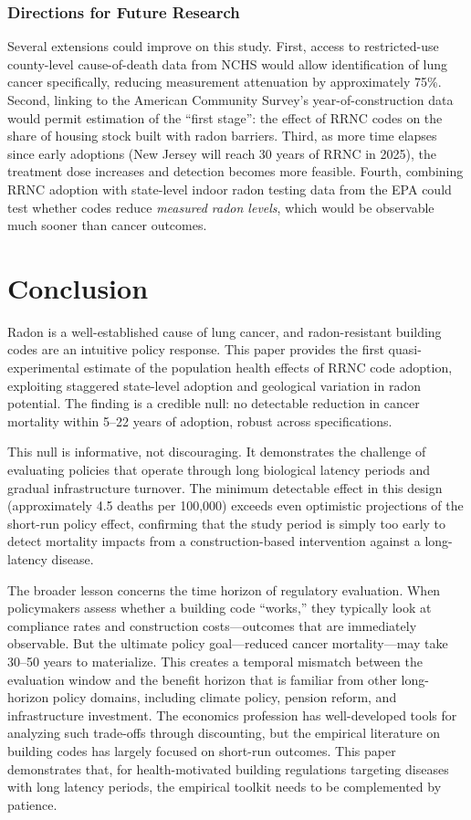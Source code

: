 \documentclass[12pt]{article}
\begin{document}
\subsubsection*{Directions for Future Research} Several extensions could improve on this study. First, access to restricted-use county-level cause-of-death data from NCHS would allow identification of lung cancer specifically, reducing measurement attenuation by approximately 75\%. Second, linking to the American Community Survey's year-of-construction data would permit estimation of the ``first stage'': the effect of RRNC codes on the share of housing stock built with radon barriers. Third, as more time elapses since early adoptions (New Jersey will reach 30 years of RRNC in 2025), the treatment dose increases and detection becomes more feasible. Fourth, combining RRNC adoption with state-level indoor radon testing data from the EPA could test whether codes reduce \emph{measured radon levels}, which would be observable much sooner than cancer outcomes.


\section{Conclusion}

Radon is a well-established cause of lung cancer, and radon-resistant building codes are an intuitive policy response. This paper provides the first quasi-experimental estimate of the population health effects of RRNC code adoption, exploiting staggered state-level adoption and geological variation in radon potential. The finding is a credible null: no detectable reduction in cancer mortality within 5--22 years of adoption, robust across specifications.

This null is informative, not discouraging. It demonstrates the challenge of evaluating policies that operate through long biological latency periods and gradual infrastructure turnover. The minimum detectable effect in this design (approximately 4.5 deaths per 100,000) exceeds even optimistic projections of the short-run policy effect, confirming that the study period is simply too early to detect mortality impacts from a construction-based intervention against a long-latency disease.

The broader lesson concerns the time horizon of regulatory evaluation. When policymakers assess whether a building code ``works,'' they typically look at compliance rates and construction costs---outcomes that are immediately observable. But the ultimate policy goal---reduced cancer mortality---may take 30--50 years to materialize. This creates a temporal mismatch between the evaluation window and the benefit horizon that is familiar from other long-horizon policy domains, including climate policy, pension reform, and infrastructure investment. The economics profession has well-developed tools for analyzing such trade-offs through discounting, but the empirical literature on building codes has largely focused on short-run outcomes. This paper demonstrates that, for health-motivated building regulations targeting diseases with long latency periods, the empirical toolkit needs to be complemented by patience.
\end{document}
